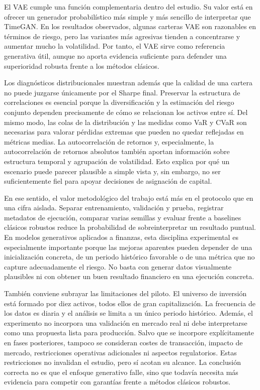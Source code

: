 \documentclass[11pt,a4paper,spanish,oneside]{book}
\numberwithin{equation}{chapter}
\numberwithin{figure}{chapter}
\begin{document}
El VAE cumple una función complementaria dentro del estudio. Su valor está en ofrecer un generador probabilístico más simple y más sencillo de interpretar que TimeGAN. En los resultados observados, algunas carteras VAE son razonables en términos de riesgo, pero las variantes más agresivas tienden a concentrarse y aumentar mucho la volatilidad. Por tanto, el VAE sirve como referencia generativa útil, aunque no aporta evidencia suficiente para defender una superioridad robusta frente a los métodos clásicos.

Los diagnósticos distribucionales muestran además que la calidad de una cartera no puede juzgarse únicamente por el Sharpe final. Preservar la estructura de correlaciones es esencial porque la diversificación y la estimación del riesgo conjunto dependen precisamente de cómo se relacionan los activos entre sí. Del mismo modo, las colas de la distribución y las medidas como VaR y CVaR son necesarias para valorar pérdidas extremas que pueden no quedar reflejadas en métricas medias. La autocorrelación de retornos y, especialmente, la autocorrelación de retornos absolutos también aportan información sobre estructura temporal y agrupación de volatilidad. Esto explica por qué un escenario puede parecer plausible a simple vista y, sin embargo, no ser suficientemente fiel para apoyar decisiones de asignación de capital.

En ese sentido, el valor metodológico del trabajo está más en el protocolo que en una cifra aislada. Separar entrenamiento, validación y prueba, registrar metadatos de ejecución, comparar varias semillas y evaluar frente a baselines clásicos robustos reduce la probabilidad de sobreinterpretar un resultado puntual. En modelos generativos aplicados a finanzas, esta disciplina experimental es especialmente importante porque las mejoras aparentes pueden depender de una inicialización concreta, de un periodo histórico favorable o de una métrica que no capture adecuadamente el riesgo. No basta con generar datos visualmente plausibles ni con obtener un buen resultado financiero en una ejecución concreta.

También conviene subrayar las limitaciones del piloto. El universo de inversión está formado por diez activos, todos ellos de gran capitalización. La frecuencia de los datos es diaria y el análisis se limita a un único periodo histórico. Además, el experimento no incorpora una validación en mercado real ni debe interpretarse como una propuesta lista para producción. Salvo que se incorpore explícitamente en fases posteriores, tampoco se consideran costes de transacción, impacto de mercado, restricciones operativas adicionales ni aspectos regulatorios. Estas restricciones no invalidan el estudio, pero sí acotan su alcance. La conclusión correcta no es que el enfoque generativo falle, sino que todavía necesita más evidencia para competir con garantías frente a métodos clásicos robustos.
\end{document}
